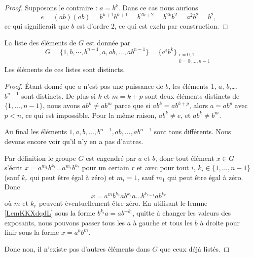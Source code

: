 \begin{proof}
    Supposons le contraire : \( a=b^k\). Dans ce cas nous aurions
    \begin{equation}
        e=(ab)(ab)=b^{k+1}b^{k+1}=b^{2k+2}=b^{2k}b^2=a^2b^2=b^2,
    \end{equation}
    ce qui signifierait que \( b\) est d'ordre \( 2\), ce qui est exclu par construction.
\end{proof}

\begin{proposition}      \label{PROPooEPVGooQjHRJp}
    La liste des éléments de \( G\) est donnée par
    \begin{equation}
        G=\{ 1,b,\cdots,b^{n-1},a,ab,\ldots, ab^{n-1} \}=\{ a^{\epsilon}b^k\}_{\substack{\epsilon=0,1\\k=0,\ldots, n-1}}
    \end{equation}
    Les éléments de ces listes sont distincts.
\end{proposition}

\begin{proof}
    Étant donné que \( a\) n'est pas une puissance de \( b\), les éléments \( 1\), \( a\), \( b\),\ldots, \( b^{n-1}\) sont distincts. De plus si \( k\) et \( m=k+p\) sont deux éléments distincts de \( \{ 1,\ldots, n-1 \}\), nous avons \( ab^k\neq ab^m\) parce que si \( ab^k=ab^{k+p}\), alors \( a=ab^p\) avec \( p<n\), ce qui est impossible. Pour la même raison, \( ab^k\neq e\), et \( ab^k\neq b^m\).

    Au final les éléments \( 1,a,b,\ldots, b^{n-1},ab,\ldots, ab^{n-1}\) sont tous différents. Nous devons encore voir qu'il n'y en a pas d'autres.

    Par définition le groupe \( G\) est engendré par \( a\) et \( b\), donc tout élément \( x\in G\) s'écrit $x=a^{m_1}b^{k_1}\ldots a^{m_r}b^{k_r}$ pour un certain \( r\) et avec pour tout \( i\), \( k_i\in\{ 1,\ldots, n-1 \}\) (sauf \( k_r\) qui peut être égal à zéro) et \( m_i=1\), sauf \( m_1\) qui peut être égal à zéro. Donc
    \begin{equation}
        x=a^mb^{k_1}ab^{k_2}a\ldots b^{k_{r-1}}ab^{k_r}
    \end{equation}
    où \( m\) et \( k_r\) peuvent éventuellement être zéro. En utilisant le lemme \ref{LemKKXdqdL} sous la forme \( b^{k_i}a=ab^{-k_i}\), quitte à changer les valeurs des exposants, nous pouvons passer tous les \( a \) à gauche et tous les \( b\) à droite pour finir sous la forme \( x=a^kb^m\). 

    Donc non, il n'existe pas d'autres éléments dans \( G\) que ceux déjà listés.
\end{proof}

